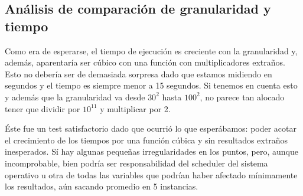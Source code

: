 \subsection{Análisis de comparación de granularidad y tiempo}
Como era de esperarse, el tiempo de ejecución es creciente con la granularidad y, además,
aparentaría ser cúbico con una función con multiplicadores extraños. Esto no debería ser de
demasiada sorpresa dado que estamos midiendo en segundos y el tiempo es siempre menor a 15 segundos.
Si tenemos en cuenta esto y además que la granularidad va desde $30^2$ hasta $100^2$, no parece tan
alocado tener que dividir por $10^{11}$ y multiplicar por 2.

Éste fue un test satisfactorio dado que ocurrió lo que esperábamos: poder acotar el crecimiento de
los tiempos por una función cúbica y sin resultados extraños inesperados. Sí hay algunas pequeñas
irregularidades en los puntos, pero, aunque incomprobable, bien podría ser responsabilidad del
scheduler del sistema operativo u otra de todas las variables que podrían haber afectado mínimamente
los resultados, aún sacando promedio en 5 instancias.

